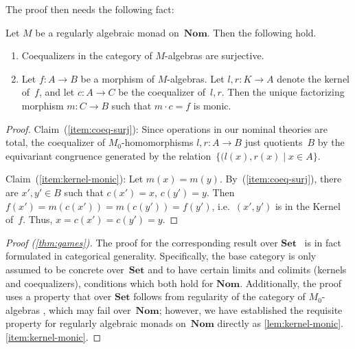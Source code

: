 \documentclass[a4paper,UKenglish,cleveref,thm-restate,numberwithinsect,final]{lipics-v2021}
\theoremstyle{plain}
\numberwithin{equation}{section}
\newcommand{\Set}{\mathbf{Set}}
\newcommand{\+}[1]{\mathcal{#1}\xspace}
\newcommand{\Nom}{\mathbf{Nom}}
\theoremstyle{definition}
\begin{document}
\noindent The proof then needs the following fact:
\begin{lemma}\label{lem:kernel-monic}
  Let $M$ be a regularly algebraic monad on~$\Nom$. Then the following
  hold.
  \begin{enumerate}
  \item\label{item:coeq-surj} Coequalizers in the category of
    $M$-algebras are surjective.
  \item\label{item:kernel-monic} Let $f\colon A\to B$ be a morphism of
    $M$-algebras. Let $l,r\colon K\to A$ denote the kernel of~$f$, and
    let $c\colon A\to C$ be the coequalizer of~$l,r$. Then the unique
    factorizing morphism $m\colon C\to B$ such that $m\cdot c=f$ is
    monic.
  \end{enumerate}
\end{lemma}
\begin{proof}
  Claim~(\ref{item:coeq-surj}): Since operations in our nominal theories
  are total, the coequalizer of $M_0$-homomorphisms $l,r\colon A\to B$
  just quotients~$B$ by the equivariant congruence generated by the
  relation~$\{(l(x),r(x)\mid x\in A\}$.

  Claim~(\ref{item:kernel-monic}): Let
  $m(x)=m(y)$. By~(\ref{item:coeq-surj}), there are $x',y'\in B$ such
  that $c(x')=x$, $c(y')=y$. Then $f(x')=m(c(x'))=m(c(y'))=f(y')$,
  i.e.~$(x',y')$ is in the Kernel of~$f$. Thus,
  \mbox{$x=c(x')=c(y')=y$}.
\end{proof}

\begin{proof}[Proof (\cref{thm:games})] The proof for the
  corresponding result over $\Set$~\cite[Theorem~6.6]{FordEA22} is in
  fact formulated in categorical generality. Specifically, the base
  category is only assumed to be concrete over~$\Set$ and to have
  certain limits and colimits (kernels and coequalizers), conditions
  which both hold for $\Nom$. Additionally, the proof uses a property
  that over $\Set$ follows from regularity of the category of
  $M_0$-algebras \cite[full version, Remark A.3]{FordEA22}, which
  may fail over~$\Nom$; however, we have established the requisite
  property for regularly algebraic monads on~$\Nom$ directly as
  \cref{lem:kernel-monic}.\ref{item:kernel-monic}.
\end{proof}
\end{document}
